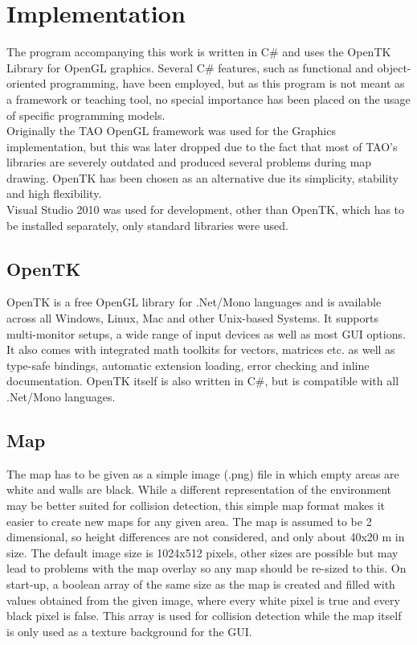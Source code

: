 \chapter{Implementation}
\label{cha:implementation}

The program accompanying this work is written in C\# and uses the OpenTK Library for OpenGL graphics. Several C\# features, such as functional and object-oriented programming, have been employed, but as this program is not meant as a framework or teaching tool, no special importance has been placed on the usage of specific programming models. \\
Originally the TAO OpenGL framework was used for the Graphics implementation, but this was later dropped due to the fact that most of TAO's libraries are severely outdated and produced several problems during map drawing. OpenTK has been chosen as an alternative due its simplicity, stability and high flexibility. \\
Visual Studio 2010 was used for development, other than OpenTK, which has to be installed separately, only standard libraries were used.

\section{OpenTK}
\label{sec:opentk}

OpenTK is a free OpenGL library for .Net/Mono languages and is available across all Windows, Linux, Mac and other Unix-based Systems. It supports multi-monitor setups, a wide range of input devices as well as most GUI options. It also comes with integrated math toolkits for vectors, matrices etc. as well as type-safe bindings, automatic extension loading, error checking and inline documentation. OpenTK itself is also written in C\#, but is compatible with all .Net/Mono languages\cite{36}.

\section{Map}
\label{sec:map}

The map has to be given as a simple image (.png) file in which empty areas are white and walls are black. While a different representation of the environment may be better suited for collision detection, this simple map format makes it easier to create new maps for any given area. The map is assumed to be 2 dimensional, so height differences are not considered, and only about 40x20 m in size. The default image size is 1024x512 pixels, other sizes are possible but may lead to problems with the map overlay so any map should be re-sized to this. On start-up, a boolean array of the same size as the map is created and filled with values obtained from the given image, where every white pixel is true and every black pixel is false. This array is used for collision detection while the map itself is only used as a texture background for the GUI.

